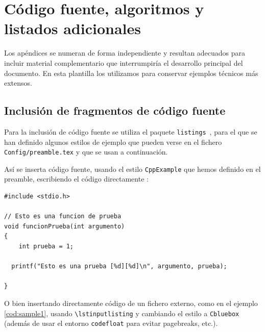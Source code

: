 %

\chapter{Código fuente, algoritmos y listados adicionales}
\label{cha:codigo-algoritmos-listados}

Los apéndices se numeran de forma independiente y resultan adecuados para incluir material complementario que interrumpiría el desarrollo principal del documento. En esta plantilla los utilizamos para conservar ejemplos técnicos más extensos.

\section{Inclusión de fragmentos de código fuente}
\label{sec:codigo-fuente}

Para la inclusión de código fuente se utiliza el paquete
\texttt{listings}~\cite{listings-manual}, para el que se han definido algunos estilos de
ejemplo que pueden verse en el fichero \texttt{Config/preamble.tex} y
que se usan a continuación.

Así se inserta código fuente, usando el estilo \texttt{CppExample} que
hemos definido en el preamble, escribiendo el código directamente :

\begin{lstlisting}[style=CppExample]
#include <stdio.h>

// Esto es una funcion de prueba
void funcionPrueba(int argumento)
{	
	int prueba = 1;

  printf("Esto es una prueba [%d][%d]\n", argumento, prueba);

}
\end{lstlisting}

O bien insertando directamente código de un fichero externo, como en el
ejemplo \ref{cod:sample1}, usando
\texttt{\textbackslash{}lstinputlisting} y cambiando el estilo a
\texttt{Cbluebox} (además de usar el entorno \texttt{codefloat} para
evitar pagebreaks, etc.).

